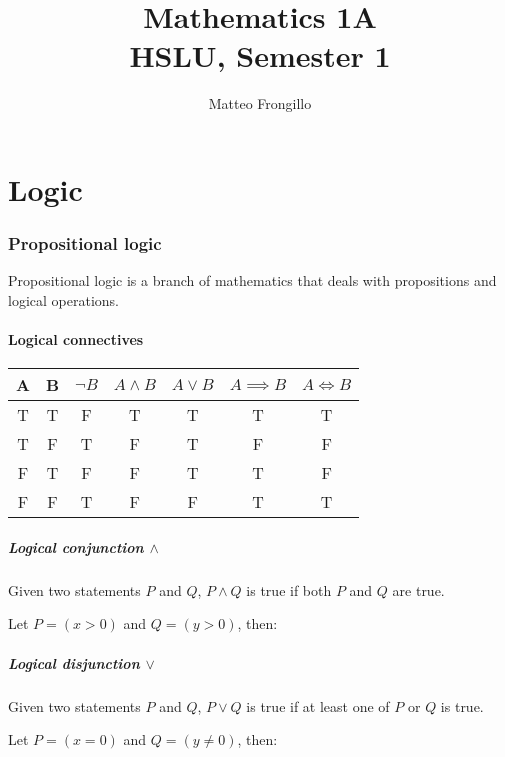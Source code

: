\documentclass{article}
\title{\textbf{Mathematics 1A \\ HSLU, Semester 1}}
\author{Matteo Frongillo}
\newcommand{\figbox}[1]{ 
    \begin{figure*}[ht!]        
        \begin{center}            
            \fbox{#1}        
        \end{center}    
    \end{figure*}
}
\begin{document}
\maketitle
\tableofcontents
\pagebreak

\part{Logic}
\section{Propositional logic}
Propositional logic is a branch of mathematics that deals with propositions and logical operations.

\subsection{Logical connectives}
\begin{center}
    \begin{tabular}{|c|c|c|c|c|c|c|}
        \hline \rule{0pt}{13pt}
        A & B & $\lnot B$ & $A \land B$ & $A \lor B$ & $A \implies B$ & $A \Leftrightarrow B$ \\
        \hline \rule{0pt}{13pt} T & T & F & T & T & T & T \\
        \hline \rule{0pt}{13pt} T & F & T & F & T & F & F \\
        \hline \rule{0pt}{13pt} F & T & F & F & T & T & F \\
        \hline \rule{0pt}{13pt} F & F & T & F & F & T & T \\
        \hline
    \end{tabular}
\end{center}

\subsubsection{Logical conjunction $\land$}
Given two statements $P$ and $Q$, $P \land Q$ is true if both $P$ and $Q$ are true.

Let $P=(x>0)$ and $Q=(y>0)$, then:
\figbox{$P \land Q = (x > 0 \land y > 0)$}

\subsubsection{Logical disjunction $\lor$}
Given two statements $P$ and $Q$, $P \lor Q$ is true if at least one of $P$ or $Q$ is true.

Let $P=(x=0)$ and $Q=(y \neq 0)$, then:
\figbox{$P \lor Q = (x = 0 \lor y \neq 0)$}
\end{document}
